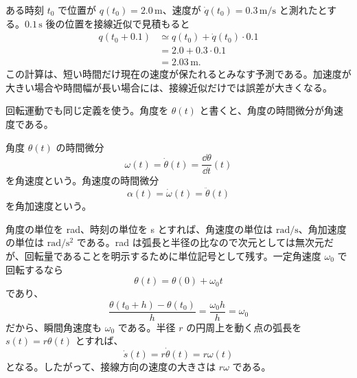 \begin{example}[短時間の位置予測]
ある時刻 $t_0$ で位置が $q(t_0)=2.0\,\mathrm{m}$、速度が $\dot{q}(t_0)=0.3\,\mathrm{m/s}$ と測れたとする。$0.1\,\mathrm{s}$ 後の位置を接線近似で見積もると
\begin{align}
  q(t_0+0.1)
  &\simeq q(t_0)+\dot{q}(t_0)\cdot0.1\\
  &=2.0+0.3\cdot0.1\\
  &=2.03\,\mathrm{m}.
\end{align}
この計算は、短い時間だけ現在の速度が保たれるとみなす予測である。加速度が大きい場合や時間幅が長い場合には、接線近似だけでは誤差が大きくなる。
\end{example}

回転運動でも同じ定義を使う。角度を $\theta(t)$ と書くと、角度の時間微分が角速度である。

\begin{definition}[角速度と角加速度]
角度 $\theta(t)$ の時間微分
\begin{equation}
  \omega(t)=\dot{\theta}(t)=\frac{\dd \theta}{\dd t}(t)
\end{equation}
を角速度という。角速度の時間微分
\begin{equation}
  \alpha(t)=\dot{\omega}(t)=\ddot{\theta}(t)
\end{equation}
を角加速度という。
\end{definition}

角度の単位を rad、時刻の単位を s とすれば、角速度の単位は $\mathrm{rad/s}$、角加速度の単位は $\mathrm{rad/s^2}$ である。rad は弧長と半径の比なので次元としては無次元だが、回転量であることを明示するために単位記号として残す。一定角速度 $\omega_0$ で回転するなら
\begin{equation}
  \theta(t)=\theta(0)+\omega_0t
\end{equation}
であり、
\begin{equation}
  \frac{\theta(t_0+h)-\theta(t_0)}{h}
  =\frac{\omega_0h}{h}
  =\omega_0
\end{equation}
だから、瞬間角速度も $\omega_0$ である。半径 $r$ の円周上を動く点の弧長を $s(t)=r\theta(t)$ とすれば、
\begin{equation}
  \dot{s}(t)=r\dot{\theta}(t)=r\omega(t)
\end{equation}
となる。したがって、接線方向の速度の大きさは $r\omega$ である。

